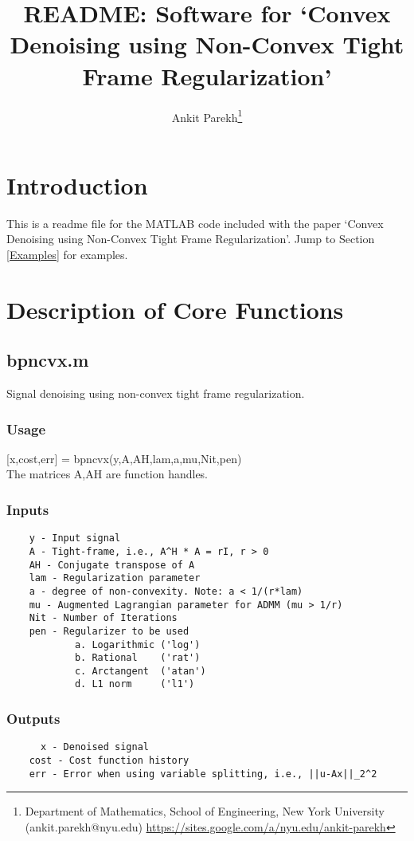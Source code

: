 \documentclass[11pt]{article}
\title{README: Software for `Convex Denoising using Non-Convex Tight Frame Regularization'}
\author{Ankit Parekh\footnote{Department of Mathematics, School of Engineering, New York University (ankit.parekh@nyu.edu) \url{https://sites.google.com/a/nyu.edu/ankit-parekh}}}
\begin{document}
\maketitle


\begin{center}
\tableofcontents
\end{center}

\clearpage
\section{Introduction}
This is a readme file for the MATLAB code included with the paper `Convex Denoising using Non-Convex Tight Frame Regularization'. Jump to Section \ref{Examples} for examples. 

\section{Description of Core Functions}
\subsection{bp\textunderscore ncvx.m}
Signal denoising using non-convex tight frame regularization. 
\subsubsection{Usage}
[x,cost,err] = bp\textunderscore ncvx(y,A,AH,lam,a,mu,Nit,pen)
\\The matrices A,AH are function handles. 
\subsubsection{Inputs}
\begin{verbatim}
    y - Input signal
    A - Tight-frame, i.e., A^H * A = rI, r > 0
    AH - Conjugate transpose of A
    lam - Regularization parameter
    a - degree of non-convexity. Note: a < 1/(r*lam)
    mu - Augmented Lagrangian parameter for ADMM (mu > 1/r)
    Nit - Number of Iterations
    pen - Regularizer to be used 
            a. Logarithmic ('log')
            b. Rational    ('rat')
            c. Arctangent  ('atan')
            d. L1 norm     ('l1')
\end{verbatim}
\subsubsection{Outputs}
\begin{verbatim}
 	  x - Denoised signal
    cost - Cost function history
    err - Error when using variable splitting, i.e., ||u-Ax||_2^2   
\end{verbatim}
\end{document}
